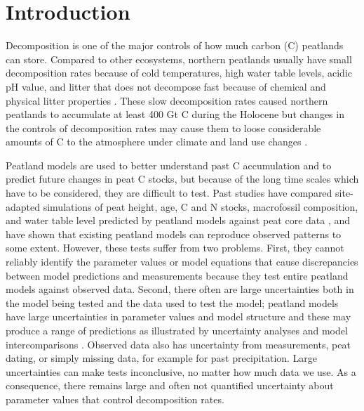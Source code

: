 \documentclass[esd, manuscript]{copernicus}
\begin{document}
\section{Introduction}

Decomposition is one of the major controls of how much carbon (C) peatlands can store. Compared to other ecosystems, northern peatlands usually have small decomposition rates because of cold temperatures, high water table levels, acidic pH value, and litter that does not decompose fast because of chemical and physical litter properties \citep{vanBreemen.1995, Rydin.2013}. These slow decomposition rates caused northern peatlands to accumulate at least 400 Gt C \citep{Yu.2012, Nichols.2019} during the Holocene but changes in the controls of decomposition rates may cause them to loose considerable amounts of C to the atmosphere under climate and land use changes \citep{Frolking.2011, Loisel.2017}.

Peatland models are used to better understand past C accumulation and to predict future changes in peat C stocks, but because of the long time scales which have to be considered, they are difficult to test. Past studies have compared site-adapted simulations of peat height, age, C and N stocks, macrofossil composition, and water table level predicted by peatland models against peat core data \citep[e.g.,][]{Frolking.2010, Tuittila.2013, Treat.2021, Zhao.2022}, and have shown that existing peatland models can reproduce observed patterns to some extent. However, these tests suffer from two problems. First, they cannot reliably identify the parameter values or model equations that cause discrepancies between model predictions and measurements because they test entire peatland models against observed data. Second, there often are large uncertainties both in the model being tested and the data used to test the model; peatland models have large uncertainties in parameter values and model structure and these may produce a range of predictions as illustrated by uncertainty analyses \citep[e.g.,][\citet{Quillet.2013a}]{Quillet.2013} and model intercomparisons \citep[e.g.,][]{Zhao.2022}. Observed data also has uncertainty from measurements, peat dating, or simply missing data, for example for past precipitation. Large uncertainties can make tests inconclusive, no matter how much data we use. As a consequence, there remains large and often not quantified uncertainty about parameter values that control decomposition rates.
\end{document}
